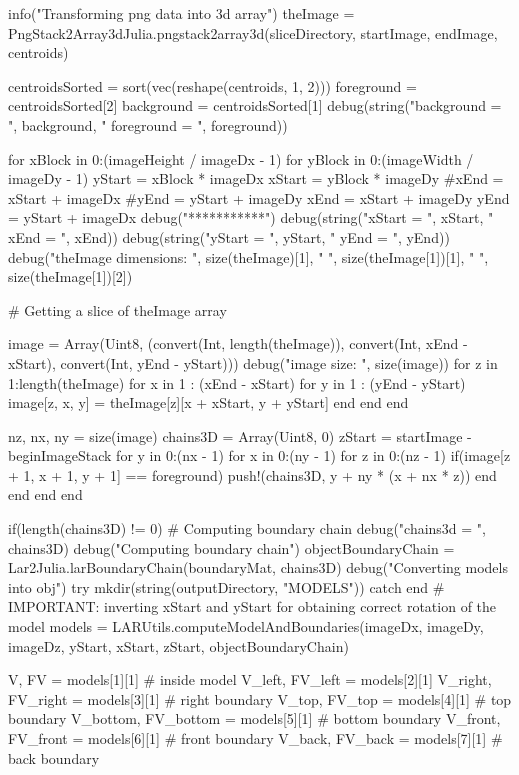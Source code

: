 \documentclass[11pt,oneside]{article}	%
\begin{document}
{  info("Transforming png data into 3d array")
  theImage = PngStack2Array3dJulia.pngstack2array3d(sliceDirectory, startImage, endImage, centroids)

  centroidsSorted = sort(vec(reshape(centroids, 1, 2)))
  foreground = centroidsSorted[2]
  background = centroidsSorted[1]
  debug(string("background = ", background, " foreground = ", foreground))

  for xBlock in 0:(imageHeight / imageDx - 1)
    for yBlock in 0:(imageWidth / imageDy - 1)
      yStart = xBlock * imageDx
      xStart = yBlock * imageDy
      #xEnd = xStart + imageDx
      #yEnd = yStart + imageDy
      xEnd = xStart + imageDy
      yEnd = yStart + imageDx
      debug("***********")
      debug(string("xStart = ", xStart, " xEnd = ", xEnd))
      debug(string("yStart = ", yStart, " yEnd = ", yEnd))
      debug("theImage dimensions: ", size(theImage)[1], " ", size(theImage[1])[1], " ", size(theImage[1])[2])

      # Getting a slice of theImage array

      image = Array(Uint8, (convert(Int, length(theImage)), convert(Int, xEnd - xStart), convert(Int, yEnd - yStart)))
      debug("image size: ", size(image))
      for z in 1:length(theImage)
        for x in 1 : (xEnd - xStart)
          for y in 1 : (yEnd - yStart)
            image[z, x, y] = theImage[z][x + xStart, y + yStart]
          end
        end
      end

      nz, nx, ny = size(image)
      chains3D = Array(Uint8, 0)
      zStart = startImage - beginImageStack
      for y in 0:(nx - 1)
        for x in 0:(ny - 1)
          for z in 0:(nz - 1)
            if(image[z + 1, x + 1, y + 1] == foreground)
              push!(chains3D, y + ny * (x + nx * z))
            end
          end
        end
      end

      if(length(chains3D) != 0)
        # Computing boundary chain
        debug("chains3d = ", chains3D)
        debug("Computing boundary chain")
        objectBoundaryChain = Lar2Julia.larBoundaryChain(boundaryMat, chains3D)
        debug("Converting models into obj")
        try
          mkdir(string(outputDirectory, "MODELS"))
        catch
        end
        # IMPORTANT: inverting xStart and yStart for obtaining correct rotation of the model
        models = LARUtils.computeModelAndBoundaries(imageDx, imageDy, imageDz, yStart, xStart, zStart, objectBoundaryChain)

        V, FV = models[1][1] # inside model
        V_left, FV_left = models[2][1]
        V_right, FV_right = models[3][1] # right boundary
        V_top, FV_top = models[4][1] # top boundary
        V_bottom, FV_bottom = models[5][1] # bottom boundary
        V_front, FV_front = models[6][1] # front boundary
        V_back, FV_back = models[7][1] # back boundary

}
\end{document}
